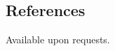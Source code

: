 \documentclass[margin,line]{res}
\begin{document}
\begin{resume}
\section{\sc References}
Available upon requests.
\begin{comment}
\begin{tabular}{@{}p{3in}p{3in}}
{\bf Prof. David Wetherall} & {\bf Dr. Jaeyeon Jung} \\
{\em Computer Science and Engineering} & \\
University of Washington & Microsoft Research \\
{djw@cs.washington.edu} & {jjung@microsoft.com} \\
\\
{\bf Prof. Arvind Krishnamurthy} & {\bf Dr. Matthai Philipose} \\
{\em Computer Science and Engineering} &  \\
University of Washington & Microsoft Research \\
{arvind@cs.washington.edu} & {matthaip@microsoft.com}

\end{tabular}
\end{comment}
\end{resume}
\end{document}

